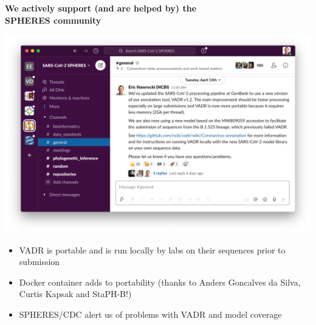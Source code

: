\documentclass[landscape]{slides}
\begin{document}
%
%
\begin{slide}
\begin{center}
\large{\textbf{We actively support (and are helped by) the \\ SPHERES community}}

\includegraphics[width=7in]{figs/spheres-slack-apr132021}

\small
\begin{itemize}
\item VADR is portable and is run locally by labs on their sequences prior to submission
\item Docker container adds to portability (thanks to Anders Goncalves da Silva, Curtis Kapsak and StaPH-B!)
\item SPHERES/CDC alert us of problems with VADR and model coverage
\end{itemize}

\end{center}

\vfill
\end{slide}
\end{document}
